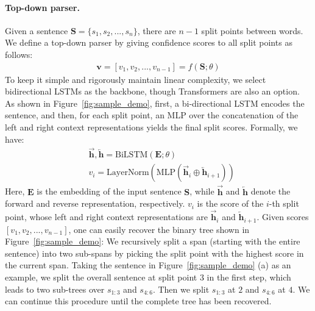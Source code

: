 \paragraph{Top-down parser.}
Given a sentence $\mathbf{S} = \{s_{1}, s_{2},..., s_{n}\}$, there are $n-1$ split points between words. 
We define a top-down parser by giving confidence scores to all split points as follows:
\begin{equation}
\begin{aligned}
\textbf{v}=[v_{1}, v_{2}, ..., v_{n-1}] = f(\mathbf{S};\theta)
\end{aligned}
\end{equation}
To keep it simple and rigorously maintain linear complexity, we select bidirectional LSTMs as the backbone, though Transformers are also an option.
As shown in Figure~\ref{fig:sample_demo}, 
first, a bi-directional LSTM encodes the sentence, 
and then, for each split point, an MLP over the concatenation of the left and right context representations yields the final split scores. 
Formally, we have:
\begin{equation}
\begin{aligned}
\label{eq:split_score_eval}
&\overrightarrow{\textbf{h}},\overleftarrow{\textbf{h}} = \mathrm{BiLSTM}(\mathbf{E};\theta )\\
&v_{i} = \mathrm{LayerNorm}(\mathrm{MLP}(\overrightarrow{\textbf{h}}_{i}\oplus \overleftarrow{\textbf{h}}_{i+1}))
\end{aligned}
\end{equation}
Here, $\mathbf{E}$ is the embedding of the input sentence $\mathbf{S}$, while
$\overrightarrow{\textbf{h}}$ and $\overleftarrow{\textbf{h}}$ denote the forward and reverse representation, respectively. 
$v_{i}$ is the score of the $i$-th split point, whose left and right context representations are $\overrightarrow{\textbf{h}}_{i}$ and $\overleftarrow{\textbf{h}}_{i+1}$. 
Given scores $[v_1, v_2, ..., v_{n-1}]$, one can easily recover the binary tree shown in Figure~\ref{fig:sample_demo}:
We recursively split a span (starting with the entire sentence) into two sub-spans by picking the split point with the highest score in the current span.
Taking the sentence in Figure~\ref{fig:sample_demo} (a) as an 
example, we split the overall sentence at split point $3$ in the first step, which leads to two sub-trees over $s_{1:3}$ and $s_{4:6}$. 
Then we split $s_{1:3}$ at $2$ and $s_{4:6}$ at $4$. We can continue this procedure until the complete tree has been recovered. 

